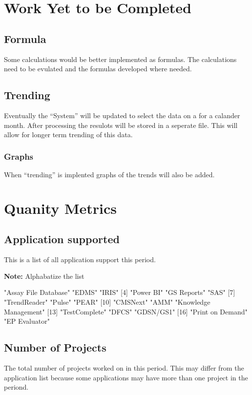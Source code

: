 \documentclass{article}
\begin{document}
\section{Work Yet to be Completed}
\subsection{Formula}
Some calculations would be better implemented as formulas. The calculations need
to be evulated and the formulas developed where needed.
\subsection{Trending}
Eventually the ``System'' will be updated to select the data on a for a calander
month. After processing the resulots will be stored in a seperate file.
This will allow for longer term trending of this data.
\subsubsection{Graphs}
When ``trending'' is implented graphs of the trends will also be added.


\section{Quanity Metrics}
\subsection{Application supported}
This is a list of all application support this period.

\textbf{Note:} Alphabatize the list

\begin{Schunk}
\begin{Soutput}
 [1] "Assay File Database"  "EDMS"                 "IRIS"                
 [4] "Power BI"             "GS Reports"           "SAS"                 
 [7] "TrendReader"          "Pulse"                "PEAR"                
[10] "CMSNext"              "AMM"                  "Knowledge Management"
[13] "TestComplete"         "DFCS"                 "GDSN/GS1"            
[16] "Print on Demand"      "EP Evaluator"        
\end{Soutput}
\end{Schunk}

\subsection{Number of Projects}
The total number of  projects worked on in this period. This may differ from the
application list because some applications may have more than one project in
the periond.
\end{document}
